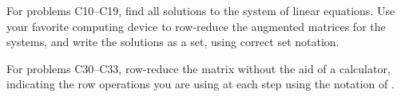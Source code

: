 %
\begin{exercisegroup}
\begin{para}For problems C10--C19, find all solutions to the system of linear equations.  Use your favorite computing device to row-reduce the augmented matrices for the systems, and write the solutions as a set, using correct set notation.\end{para}
%
\end{exercisegroup}
%
%
\begin{exercisegroup}
\begin{para}For problems C30--C33, row-reduce the matrix without the aid of a calculator, indicating the row operations you are using at each step using the notation of .\end{para}
%
\end{exercisegroup}
%
%
%
%
